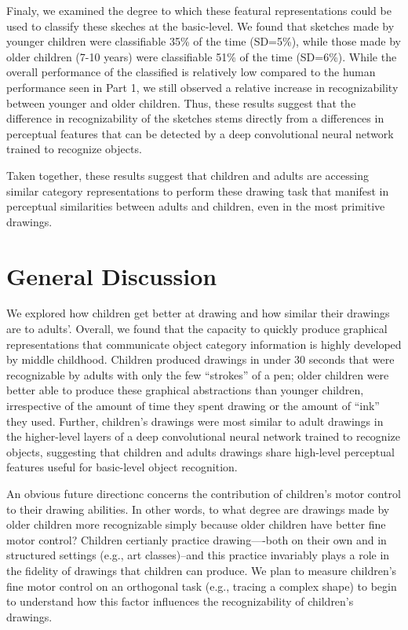 \documentclass[10pt, letterpaper]{article}
\begin{document}
Finaly, we examined the degree to which these featural representations
could be used to classify these skeches at the basic-level. We found
that sketches made by younger children were classifiable 35\% of the
time (SD=5\%), while those made by older children (7-10 years) were
classifiable 51\% of the time (SD=6\%). While the overall performance of
the classified is relatively low compared to the human performance seen
in Part 1, we still observed a relative increase in recognizability
between younger and older children. Thus, these results suggest that the
difference in recognizability of the sketches stems directly from a
differences in perceptual features that can be detected by a deep
convolutional neural network trained to recognize objects.

Taken together, these results suggest that children and adults are
accessing similar category representations to perform these drawing task
that manifest in perceptual similarities between adults and children,
even in the most primitive drawings.

\section{General Discussion}\label{general-discussion}

We explored how children get better at drawing and how similar their
drawings are to adults'. Overall, we found that the capacity to quickly
produce graphical representations that communicate object category
information is highly developed by middle childhood. Children produced
drawings in under 30 seconds that were recognizable by adults with only
the few ``strokes'' of a pen; older children were better able to produce
these graphical abstractions than younger children, irrespective of the
amount of time they spent drawing or the amount of ``ink'' they used.
Further, children's drawings were most similar to adult drawings in the
higher-level layers of a deep convolutional neural network trained to
recognize objects, suggesting that children and adults drawings share
high-level perceptual features useful for basic-level object
recognition.

An obvious future directionc concerns the contribution of children's
motor control to their drawing abilities. In other words, to what degree
are drawings made by older children more recognizable simply because
older children have better fine motor control? Children certianly
practice drawing----both on their own and in structured settings (e.g.,
art classes)--and this practice invariably plays a role in the fidelity
of drawings that children can produce. We plan to measure children's
fine motor control on an orthogonal task (e.g., tracing a complex shape)
to begin to understand how this factor influences the recognizability of
children's drawings.
\end{document}
